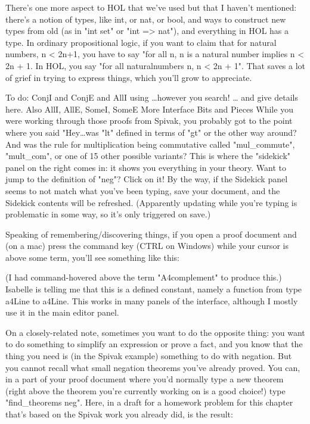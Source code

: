 There's one more aspect to HOL that we've used but that I haven't mentioned: there's a notion of types, like int, or nat, or bool, and ways to construct new types from old (as in "int set" or "int => nat"), and everything in HOL has a type. In ordinary propositional logic, if you want to claim that for natural numbers, n < 2n+1, you have to say "for all n,  n is a natural number implies n < 2n + 1. In HOL, you say "for all naturalnumbers n, n < 2n + 1". That saves a lot of grief in trying to express things, which you'll grow to appreciate. 

To do: ConjI and ConjE and AllI using …however you search! … and give details here. Also AllI, AllE, SomeI, SomeE
More Interface Bits and Pieces
While you were working through those proofs from Spivak, you probably got to the point where you said "Hey…was "lt" defined in terms of "gt" or the other way around? And was the rule for multiplication being commutative called "mul_commute", "mult_com", or one of 15 other possible variants? This is where the "sidekick" panel on the right comes in: it shows you everything in your theory. Want to jump to the definition of "neg"? Click on it! By the way, if the Sidekick panel seems to not match what you've been typing, save your document, and the Sidekick contents will be refreshed. (Apparently updating while you're typing is problematic in some way, so it's only triggered on save.)

Speaking of remembering/discovering things, if you open a proof document and (on a mac) press the command key (CTRL on Windows) while your cursor is above some term, you'll see something like this:



(I had command-hovered above the term "A4complement" to produce this.) Isabelle is telling me that this is a defined constant, namely a function from type a4Line to a4Line. This works in many panels of the interface, although I mostly use it in the main editor panel. 

On a closely-related note, sometimes you want to do the opposite thing: you want to do something to simplify an expression or prove a fact, and you know that the thing you need is (in the Spivak example) something to do with negation. But you cannot recall what small negation theorems you've already proved. You can, in a part of your proof document where you'd normally type a new theorem (right above the theorem you're currently working on is a good choice!) type "find_theorems neg". Here, in a draft for a homework problem for this chapter that's based on the Spivak work you already did, is the result:

